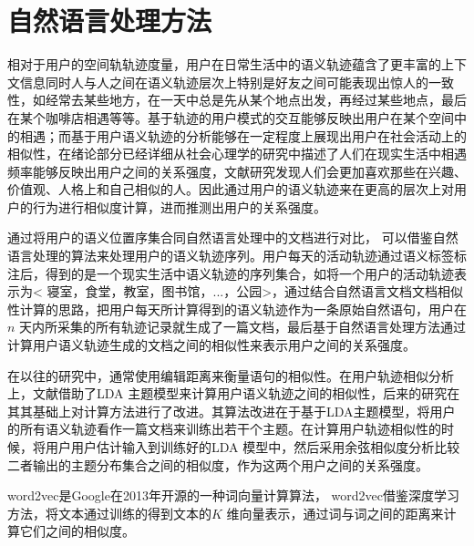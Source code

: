 \section{自然语言处理方法}
\label{sec:section2-3}
相对于用户的空间轨轨迹度量，用户在日常生活中的语义轨迹蕴含了更丰富的上下文信息同时人与人之间在语义轨迹层次上特别是好友之间可能表现出惊人的一致性，如经常去某些地方，在一天中总是先从某个地点出发，再经过某些地点，最后在某个咖啡店相遇等等。基于轨迹的用户模式的交互能够反映出用户在某个空间中的相遇；而基于用户语义轨迹的分析能够在一定程度上展现出用户在社会活动上的相似性，在绪论部分已经详细从社会心理学的研究中描述了人们在现实生活中相遇频率能够反映出用户之间的关系强度，文献\cite{singelis1994measurement}研究发现人们会更加喜欢那些在兴趣、价值观、人格上和自己相似的人。因此通过用户的语义轨迹来在更高的层次上对用户的行为进行相似度计算，进而推测出用户的关系强度。
\par 通过将用户的语义位置序集合同自然语言处理中的文档进行对比， 可以借鉴自然语言处理的算法来处理用户的语义轨迹序列。用户每天的活动轨迹通过语义标签标注后，得到的是一个现实生活中语义轨迹的序列集合，如将一个用户的活动轨迹表示为< 寝室，食堂，教室，图书馆，...，公园>，通过结合自然语言文档文档相似性计算的思路，把用户每天所计算得到的语义轨迹作为一条原始自然语句，用户在$n$ 天内所采集的所有轨迹记录就生成了一篇文档，最后基于自然语言处理方法通过计算用户语义轨迹生成的文档之间的相似性来表示用户之间的关系强度。
\par 在以往的研究中，通常使用编辑距离来衡量语句的相似性。在用户轨迹相似分析上，文献\cite{farrahi2008did}借助了LDA 主题模型来计算用户语义轨迹之间的相似性，后来的研究在其其基础上对计算方法进行了改进。其算法改进在于基于LDA主题模型，将用户的所有语义轨迹看作一篇文档来训练出若干个主题。在计算用户轨迹相似性的时候，将用户用户估计输入到训练好的LDA 模型中，然后采用余弦相似度分析比较二者输出的主题分布集合之间的相似度，作为这两个用户之间的关系强度。
\par word2vec是Google在2013年开源的一种词向量计算算法， word2vec借鉴深度学习方法，将文本通过训练的得到文本的$K$ 维向量表示，通过词与词之间的距离来计算它们之间的相似度。
